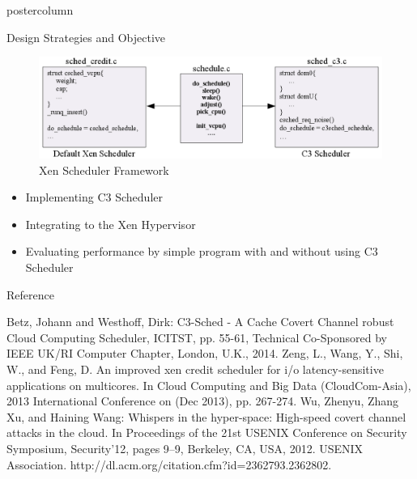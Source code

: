\documentclass[final,hyperref={pdfpagelabels=false}]{beamer}
\begin{document}
\begin{frame}
\begin{columns}
\begin{column}{.49\textwidth}
\begin{beamercolorbox}[center,wd=\textwidth]{postercolumn}
\begin{minipage}[T]{.95\textwidth}
{\begin{block}{\Large \color{ta2skyblue} Design Strategies and Objective}
\begin{figure}\vspace{1cm}
\includegraphics[width=0.85\linewidth]{c3_scheduler_framework.png}
\caption{\color{black}\large Xen Scheduler Framework}
\end{figure}\vspace{1cm}

\begin{itemize}
\item Implementing C3 Scheduler
\item Integrating to the Xen Hypervisor
\item Evaluating performance by simple program with and without using C3 Scheduler
\end{itemize}
 
\end{block}
           
\begin{block}{\Large \color{ta2skyblue} Reference}

\begin{thebibliography}{99}
\large
{}\normalsize  Betz, Johann and Westhoff, Dirk: C3-Sched - A Cache Covert Channel robust Cloud Computing Scheduler, ICITST, pp. 55-61, Technical Co-Sponsored by IEEE UK/RI Computer Chapter, London, U.K., 2014.  
\normalsize Zeng, L., Wang, Y., Shi, W., and Feng, D. An improved xen credit scheduler for i/o latency-sensitive applications on multicores. In Cloud Computing and Big Data (CloudCom-Asia), 2013 International Conference on (Dec 2013), pp. 267-274.
 \normalsize Wu, Zhenyu, Zhang Xu, and Haining Wang: Whispers in the hyper-space: High-speed covert channel attacks in the cloud. In Proceedings of the 21st USENIX Conference on Security Symposium, Security’12, pages 9–9, Berkeley, CA, USA, 2012. USENIX Association. http://dl.acm.org/citation.cfm?id=2362793.2362802.


\end{thebibliography}
\end{block}
\vfill          
\vfill


\begin{center}
\begin{tabular}{ccc}


\end{tabular}
\end{center}}
\end{minipage}
\end{beamercolorbox}
\end{column}
\end{columns}
\end{frame}
\end{document}
